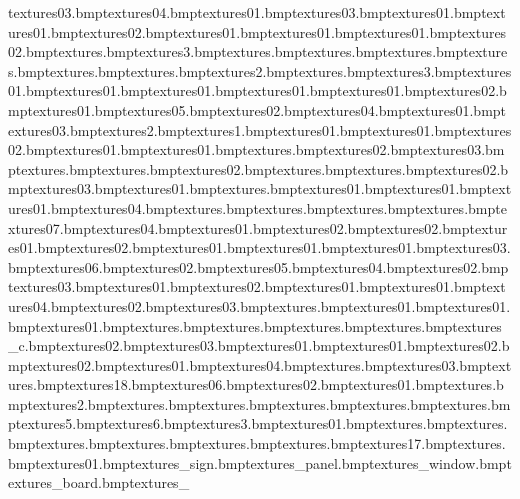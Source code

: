  textures\trolleymesh03.bmp textures\trolleyhandle04.bmp textures\trolleyhandle01.bmp textures\trolleyhandle03.bmp textures\batteryside01.bmp textures\generatorlight01.bmp textures\chairback02.bmp textures\chairback01.bmp textures\chairleg01.bmp textures\tabletop01.bmp textures\postbox02.bmp textures\tablestand.bmp textures\cleaner3.bmp textures\bucket.bmp textures\vpaintbed.bmp textures\lightstrip.bmp textures\bucketmop.bmp textures\tillseat.bmp textures\tillside.bmp textures\warningsign2.bmp textures\warningsign.bmp textures\warningsign3.bmp textures\soldierfront01.bmp textures\soldierback01.bmp textures\soldierside01.bmp textures\soldiercollar01.bmp textures\soldiershoudler01.bmp textures\soldiertrouser02.bmp textures\soldiertrouser01.bmp textures\soldierboot05.bmp textures\soldierboot02.bmp textures\soldierboot04.bmp textures\soldierboot01.bmp textures\soldierboot03.bmp textures\soldierarm2.bmp textures\soldierarm1.bmp textures\soldierhand01.bmp textures\soldierface01.bmp textures\soldierbag02.bmp textures\soldierbag01.bmp textures\soldierhat01.bmp textures\cerealsides.bmp textures\samcerealbox02.bmp textures\samcan03.bmp textures\canlids.bmp textures\bigscreen.bmp textures\tvback02.bmp textures\littledot.bmp textures\tvback.bmp textures\littletv02.bmp textures\littletv03.bmp textures\littletv01.bmp textures\tazwanted.bmp textures\clockrfront01.bmp textures\polisherchromeplastic01.bmp textures\machineback01.bmp textures\shopbowl04.bmp textures\noentry.bmp textures\plungerbhole.bmp textures\plungerbox.bmp textures\plungerboxacme.bmp textures\shopblackfloor07.bmp textures\shopblackfloor04.bmp textures\barrier01.bmp textures\barrier02.bmp textures\barrierlight02.bmp textures\barrierlight01.bmp textures02.bmp textures\postside01.bmp textures\postbox01.bmp textures01.bmp textures\papers03.bmp textures\papers06.bmp textures\papers02.bmp textures\papers05.bmp textures\papers04.bmp textures\spinnysign02.bmp textures\spinnysign03.bmp textures\spinnysign01.bmp textures\signpost02.bmp textures\signpost01.bmp textures\signboard01.bmp textures\signboard04.bmp textures\signboard02.bmp textures\signboard03.bmp textures\racecarfront.bmp textures\racetrak01.bmp textures\racecar01.bmp textures\racecarwin01.bmp textures\racecarrear.bmp textures\racecarchasis.bmp textures\racecarheadlight.bmp textures\racecarglowlight.bmp textures\wheel_c.bmp textures\robotfront02.bmp textures\robotfront03.bmp textures\robotfront01.bmp textures\robotside01.bmp textures\gumballs02.bmp textures\gumballpost02.bmp textures\gumballpost01.bmp textures\machineback04.bmp textures\winsports.bmp textures\gumballpost03.bmp textures\maintenancedoor.bmp textures\train18.bmp textures\leading06.bmp textures\bowlingpin02.bmp textures\bowlingpin01.bmp textures\cricketstumps.bmp textures\cricketstumps2.bmp textures\trolleytop.bmp textures\trolleywheel.bmp textures\testtex.bmp textures\marbstat.bmp textures\blacktile.bmp textures\testtex5.bmp textures\testtex6.bmp textures\testtex3.bmp textures\roxtex01.bmp textures\water.bmp textures\lace.bmp textures\tazwantedposback.bmp textures\post.bmp textures\stopper.bmp textures\wires.bmp textures\sportsnfl17.bmp textures\tableleg.bmp textures\megabomb01.bmp textures\kiosk_sign.bmp textures\kiosk_panel.bmp textures\kiosk_window.bmp textures\kiosk_board.bmp textures\kiosk_